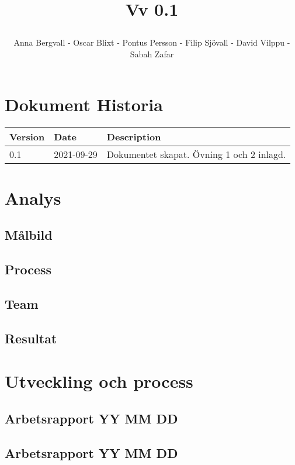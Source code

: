 \documentclass{article}
\date {#1}
\title {
    \documentNumber {01}    

    \documentTitle {Helsingborg Event and Convention Bureau}
    
    \documentDate {2021-09-29}
    \documentVersion Vv 0.1
    
    \author{Anna Bergvall - Oscar Blixt - Pontus Persson - Filip Sjövall - David Vilppu - Sabah Zafar}
}
\begin{document}
\maketitle

\thispagestyle{empty}



\newpage

\tableofcontents


\newpage

\section{Dokument Historia}
\begin{tabular}{ l | l | l }
    Version & Date & Description \\
    \hline
    0.1 & 2021-09-29 & Dokumentet skapat. Övning 1 och 2 inlagd. \\
    \hline
   
\end{tabular}

\newpage
\section{Analys}
\subsection{Målbild}
\subsection{Process}
\subsection{Team}
\subsection{Resultat}

\section{Utveckling och process}
\subsection{Arbetsrapport YY MM DD}
\subsection{Arbetsrapport YY MM DD}
\end{document}
